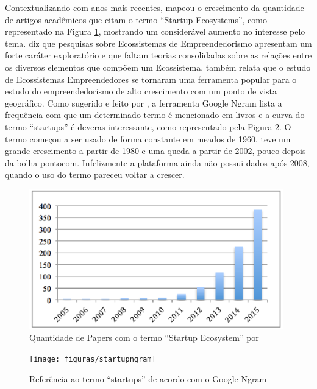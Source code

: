 Contextualizando com anos mais recentes,  mapeou o crescimento da quantidade de artigos acadêmicos que citam o termo ``Startup Ecosystems'', como representado na Figura \ref{figure:papers_about_startup_ecosystems}, mostrando um considerável aumento no interesse pelo tema.  diz que pesquisas sobre Ecossistemas de Empreendedorismo apresentam um forte caráter exploratório e que faltam teorias consolidadas sobre as relações entre os diversos elementos que compõem um Ecossistema.  também relata que o estudo de Ecossistemas Empreendedores se tornaram uma ferramenta popular para o estudo do empreendedorismo de alto crescimento com um ponto de vista geográfico. Como sugerido e feito por , a ferramenta Google Ngram lista a frequência com que um determinado termo é mencionado em livros e a curva do termo ``startups'' é deveras interessante, como representado pela Figura \ref{figure:startupngram}. O termo começou a ser usado de forma constante em meados de 1960, teve um grande crescimento a partir de 1980 e uma queda a partir de 2002, pouco depois da bolha pontocom. Infelizmente a plataforma ainda não possui dados após 2008, quando o uso do termo pareceu voltar a crescer. 

\begin{figure}[!htb]
	\centering
	\includegraphics[width=11cm,angle=0]{figuras/papers_about_startup_ecosystems}
	\caption{Quantidade de Papers com o termo ``Startup Ecosystem'' por }
	\label{figure:papers_about_startup_ecosystems}
\end{figure}

\begin{figure}[!htb]
	\centering
	\texttt{[image: figuras/startupngram]}
	\caption{Referência ao termo ``startups'' de acordo com o Google Ngram}
	\label{figure:startupngram}
\end{figure}

